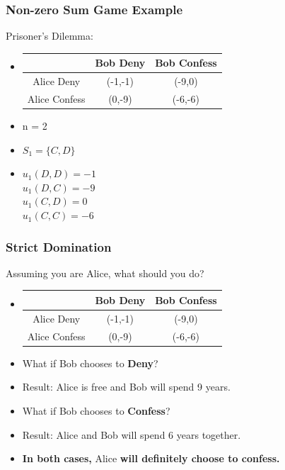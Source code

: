 \documentclass{beamer}
\begin{document}
\begin{frame}
\frametitle{Non-zero Sum Game Example}
Prisoner's Dilemma:\\
\begin{itemize}[<+->]
\item
\begin{tabular}{|c|c|c|}
\hline
\hline
    &{\color{red}Bob} Deny&{\color{red}Bob} Confess\\
\hline
{\color{blue}Alice} Deny& ({\color{blue}-1},{\color{red}-1}) & ({\color{blue}-9},{\color{red}0})\\
\hline
{\color{blue}Alice} Confess& ({\color{blue}0},{\color{red}-9}) & ({\color{blue}-6},{\color{red}-6})\\
\hline
\hline
\end{tabular}
\item
n = 2
\item
{\color{blue}$S_1 = \{ C, D\}$}  
\item
{\color{blue}$u_1(D,D) = -1$} \\
{\color{blue}$u_1(D,C) = -9$} \\
{\color{blue}$u_1(C,D) = 0 $} \text{ } \\
{\color{blue}$u_1(C,C) = -6$} 
\end{itemize}
\end{frame}

\begin{frame}
\frametitle{Strict Domination}
Assuming you are {\color{blue}Alice}, what should you do?\\
\begin{itemize}[<+->]
\item
\begin{tabular}{|c|c|c|}
\hline
\hline
    &{\color{red}Bob} Deny&{\color{red}Bob} Confess\\
\hline
{\color{blue}Alice} Deny& ({\color{blue}-1},{\color{red}-1}) & ({\color{blue}-9},{\color{red}0})\\
\hline
{\color{blue}Alice} Confess& ({\color{blue}0},{\color{red}-9}) & ({\color{blue}-6},{\color{red}-6})\\
\hline
\hline
\end{tabular}

\item
What if {\color{red}Bob} chooses to \textbf{Deny}?
\item
Result: {\color{blue}Alice} is free and {\color{red}Bob} will spend 9 years.
\item
What if {\color{red}Bob} chooses to \textbf{Confess}?
\item
Result: {\color{blue}Alice} and {\color{red}Bob} will spend 6 years together.
\item
\textbf{In both cases, }{\color{blue}Alice}\textbf{ will definitely choose to confess.}
\end{itemize}
\end{frame}
\end{document}
